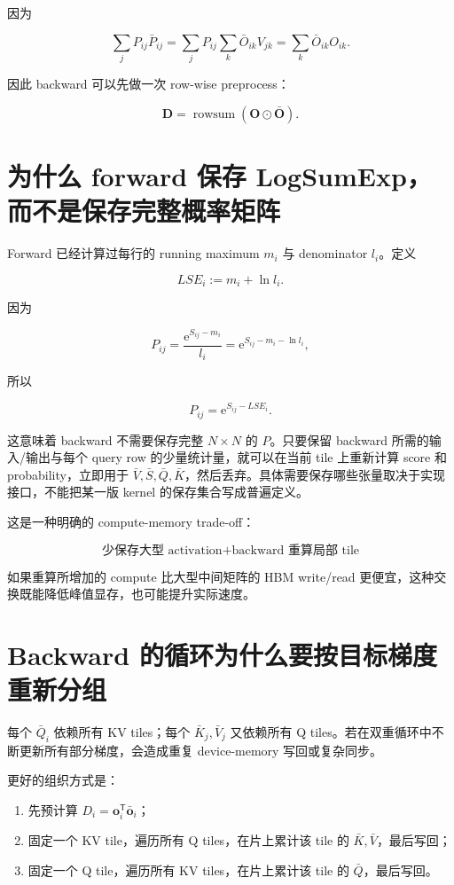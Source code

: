 \documentclass[profile=standard,twoside=false]{ipara-handbook}
\begin{document}
因为

$$
\sum_jP_{ij}\bar P_{ij}
=\sum_jP_{ij}
\sum_k\bar O_{ik}V_{jk}
=\sum_k\bar O_{ik}O_{ik}.
$$

因此 backward 可以先做一次 row-wise preprocess：

$$
\boldsymbol{D}
=\operatorname{rowsum}
\left(
\boldsymbol{O}\odot\bar{\boldsymbol{O}}
\right).
$$

\section{为什么 forward 保存 LogSumExp，而不是保存完整概率矩阵}

Forward 已经计算过每行的 running maximum $m_i$ 与 denominator $l_i$。定义

$$
LSE_i
:=m_i+\ln l_i.
$$

因为

$$
P_{ij}
=\frac{\mathrm{e}^{S_{ij}-m_i}}{l_i}
=\mathrm{e}^{S_{ij}-m_i-\ln l_i},
$$

所以

$$
\boxed{
P_{ij}
=\mathrm{e}^{S_{ij}-LSE_i}
}.
$$

这意味着 backward 不需要保存完整 $N\times N$ 的 $P$。只要保留 backward 所需的输入/输出与每个 query row 的少量统计量，就可以在当前 tile 上重新计算 score 和 probability，立即用于 $\bar V,\bar S,\bar Q,\bar K$，然后丢弃。具体需要保存哪些张量取决于实现接口，不能把某一版 kernel 的保存集合写成普遍定义。

这是一种明确的 compute-memory trade-off：

$$
\boxed{
\text{少保存大型 activation}
+\text{backward 重算局部 tile}
}
$$

如果重算所增加的 compute 比大型中间矩阵的 HBM write/read 更便宜，这种交换既能降低峰值显存，也可能提升实际速度。

\section{Backward 的循环为什么要按目标梯度重新分组}

每个 $\bar Q_i$ 依赖所有 KV tiles；每个 $\bar K_j,\bar V_j$ 又依赖所有 Q tiles。若在双重循环中不断更新所有部分梯度，会造成重复 device-memory 写回或复杂同步。

更好的组织方式是：

\begin{enumerate}
  \item 先预计算 $D_i=\boldsymbol{o}_i^{\mathsf T}\bar{\boldsymbol{o}}_i$；
  \item 固定一个 KV tile，遍历所有 Q tiles，在片上累计该 tile 的 $\bar K,\bar V$，最后写回；
  \item 固定一个 Q tile，遍历所有 KV tiles，在片上累计该 tile 的 $\bar Q$，最后写回。
\end{enumerate}
\end{document}
